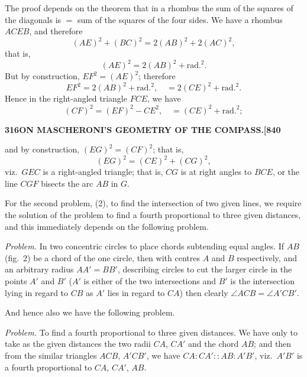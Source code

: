 \documentclass[11pt,a4paper]{book}
\begin{document}
The proof depends on the theorem that in a rhombus the sum of the squares of the diagonals is $=$ sum of the squares of the four sides. We have a rhombus $ACEB$, and therefore
\[
(AE)^2 + (BC)^2 = 2(AB)^2 + 2(AC)^2,
\]
that is,
\[
(AE)^2 = 2(AB)^2 + \text{rad.}^2.
\]
But by construction, $EF^2 = (AE)^2$; therefore
\[
EF^2 = 2(AB)^2 + \text{rad.}^2, \quad = 2(CE)^2 + \text{rad.}^2.
\]
Hence in the right-angled triangle $FCE$, we have
\[
(CF)^2 = (EF)^2 - CE^2, \quad = (CE)^2 + \text{rad.}^2;
\]

\newpage
\setcounter{page}{316}

\noindent\textbf{316}\hfill\textbf{ON MASCHERONI'S GEOMETRY OF THE COMPASS.}\hfill\textbf{[840}

\bigskip

\noindent and by construction, $(EG)^2 = (CF)^2$; that is,
\[
(EG)^2 = (CE)^2 + (CG)^2,
\]
viz.\ $GEC$ is a right-angled triangle; that is, $CG$ is at right angles to $BCE$, or the line $CGF$ bisects the arc $AB$ in $G$.

For the second problem, (2), to find the intersection of two given lines, we require the solution of the problem to find a fourth proportional to three given distances, and this immediately depends on the following problem.

\textit{Problem.} In two concentric circles to place chords subtending equal angles. If $AB$ (fig.\ 2) be a chord of the one circle, then with centres $A$ and $B$ respectively, and an arbitrary radius $AA' = BB'$, describing circles to cut the larger circle in the points $A'$ and $B'$ ($A'$ is either of the two intersections and $B'$ is the intersection lying in regard to $CB$ as $A'$ lies in regard to $CA$) then clearly $\angle ACB = \angle A'CB'$.

\begin{figure}[H]
\centering
{}
\end{figure}

And hence also we have the following problem.

\textit{Problem.} To find a fourth proportional to three given distances. We have only to take as the given distances the two radii $CA$, $CA'$ and the chord $AB$; and then from the similar triangles $ACB$, $A'CB'$, we have $CA : CA' :: AB : A'B'$, viz.\ $A'B'$ is a fourth proportional to $CA$, $CA'$, $AB$.
\end{document}
